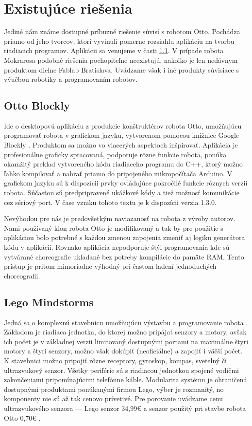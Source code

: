 \section{Existujúce riešenia}
Jediné nám známe dostupné príbuzné riešenie súvisí s robotom Otto. Pochádza priamo od jeho tvorcov, ktorí vyvinuli pomerne rozsiahlu aplikáciu na tvorbu  riadiacich programov. Aplikácii sa venujeme v časti \ref{sub:OttoBlockly}. V prípade robota Mokrarosa podobné riešenia pochopiteľne neexistujú, nakoľko je len nedávnym produktom dielne Fablab Bratislava. Uvádzame však i iné produkty súvisiace s výučbou robotiky a programovaním robotov.

\subsection{Otto Blockly}
\label{sub:OttoBlockly}
Ide o desktopovú aplikáciu z produkcie konštruktérov robota Otto, umožňujúcu programovať robota v grafickom jazyku, vytvorenom pomocou knižnice Google Blockly \cite{OttoBlockly}. Produktom sa možno vo viacerých aspektoch inšpirovať. Aplikácia je profesionálne graficky spracovaná, podporuje rôzne funkcie robota, ponúka okamžitý preklad vytvoreného kódu riadiaceho programu do C++, ktorý možno ľahko kompilovať a nahrať priamo do pripojeného mikropočítača Arduino. V grafickom jazyku sú k dispozícii prvky ovládajúce pokročilé funkcie rôznych verzií robota. Súčasťou sú predpripravené ukážkové kódy a tiež možnosť komunikácie cez sériový port. V čase vzniku tohoto textu je k dispozícii verzia 1.3.0.

Nevýhodou pre nás je predovšetkým naviazanosť na robota z výroby autorov. Nami používaný klon robota Otto je modifikovaný a tak by pre použitie s aplikáciou bolo potrebné s každou zmenou zapojenia zmeniť aj logiku generátora kódu v aplikácii. Rovnako aplikácia nepodporuje štýl programovania kde sú vytvárané choreografie ukladané bez potreby kompilácie do pamäte RAM. Tento prístup je pritom mimoriadne výhodný pri častom ladení jednoduchých choreografii. 

\subsection{Lego Mindstorms}
\label{sub:LegoMindstorms}
Jedná sa o komplexnú stavebnicu umožňujúcu výstavbu a programovanie robota \cite{LegoMindstormsEducationSet}. Základom je riadiaca jednotka, do ktorej možno pripájať senzory a motory, avšak ich počet je v základnej verzii limitovaný dostupnými portami na maximálne štyri motory a štyri senzory, možno však dokúpiť (neoficiálne)  a zapojiť i väčší počet. K stavebnici možno pripojiť rôzne receptory, gyroskop, kompas, svetelný či ultrazvukový senzor. Všetky periférie sú s riadiacou jednotkou spojené vodičmi zakončeniami pripomínajúcimi telefónne káble. Modularita systému je ohraničená dostupnými produktami ponúkanými firmou Lego, výber je rozmanitý, no komponenty nie sú až tak cenovo prívetivé. Pre porovanie uvádzame cenu ultrazvukového senzora --- Lego senzor 34,99€ \cite{LegoMindstormsUltrasonic} a senzor použitý pri stavbe robota Otto 0,70€ \cite{OttoUltrasonic}.

